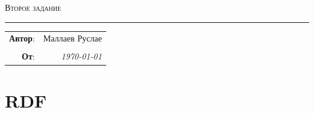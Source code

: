 \documentclass[a4paper]{article}
\begin{document}
\begin{center}
    \LARGE \textsc{Второе задание}
\end{center}

\hrule

\phantom{42}

\begin{flushright}
    \begin{tabular}{rr}
        \textbf{Автор}: 
        & Маллаев Руслае \\
        &\\
        \textbf{От}: &
        \textit{\today}\\
    \end{tabular}
\end{flushright}

\thispagestyle{empty}
\tableofcontents





\section{RDF} %
\label{sec:rdf}
\end{document}
